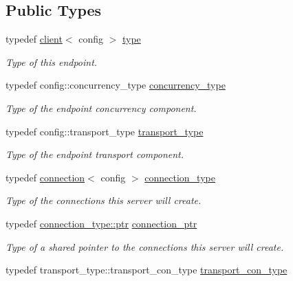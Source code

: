 \subsection*{Public Types}
\begin{DoxyCompactItemize}
\item 
typedef \hyperlink{classwebsocketpp_1_1client}{client}$<$ config $>$ \hyperlink{classwebsocketpp_1_1client_a8da6c7d382f7cae9567a7a1f1f2dd666}{type}
\begin{DoxyCompactList}\small\item\em Type of this endpoint. \end{DoxyCompactList}\item 
typedef config\+::concurrency\+\_\+type \hyperlink{classwebsocketpp_1_1client_a404ec215508a5553d3a2295fdd82977e}{concurrency\+\_\+type}
\begin{DoxyCompactList}\small\item\em Type of the endpoint concurrency component. \end{DoxyCompactList}\item 
typedef config\+::transport\+\_\+type \hyperlink{classwebsocketpp_1_1client_a042957cf1c89e7a4c39cf1ec26046e2d}{transport\+\_\+type}
\begin{DoxyCompactList}\small\item\em Type of the endpoint transport component. \end{DoxyCompactList}\item 
typedef \hyperlink{classwebsocketpp_1_1connection}{connection}$<$ config $>$ \hyperlink{classwebsocketpp_1_1client_a29c9f0410ed33a331faac19f8efea874}{connection\+\_\+type}
\begin{DoxyCompactList}\small\item\em Type of the connections this server will create. \end{DoxyCompactList}\item 
typedef \hyperlink{classwebsocketpp_1_1connection_ab910d42e3bde91546183cc54642f32ab}{connection\+\_\+type\+::ptr} \hyperlink{classwebsocketpp_1_1client_a2e187bbb2beac676bbfbc2e8065de83e}{connection\+\_\+ptr}
\begin{DoxyCompactList}\small\item\em Type of a shared pointer to the connections this server will create. \end{DoxyCompactList}\item 
typedef transport\+\_\+type\+::transport\+\_\+con\+\_\+type \hyperlink{classwebsocketpp_1_1client_af990a5c874d701129894f5cc88b69507}{transport\+\_\+con\+\_\+type}

\end{DoxyCompactItemize}
